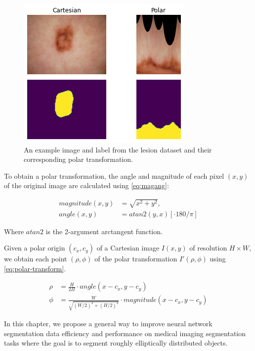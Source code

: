 	\begin{figure}[h]
		\centering
		\includegraphics[width=0.4\linewidth]{images/4/to_polar}
		\caption{An example image and label from the lesion dataset and their corresponding polar transformation.}
		\label{fig:polar-lesion}
	\end{figure}

To obtain a polar 
transformation, the angle and magnitude of each pixel $(x, y)$ of the original image are 
calculated using \eqref{eq:magang}:

  \begin{equation}
    \begin{aligned}
      magnitude(x, y) &= \sqrt{x^2 + y^2} , \\ 
      angle(x, y) &= atan2(y, x) [ \cdot 180 / \pi ]
    \end{aligned}
    \label{eq:magang}
  \end{equation}

Where $atan2$ is the 2-argument arctangent function.

Given a polar origin $(c_x, c_y)$ of a Cartesian image $I(x, y)$ of resolution $H \times W$, we obtain each point $(\rho, \phi)$ of the polar transformation $I'(\rho, \phi)$ using 
\eqref{eq:polar-transform}.

  \begin{equation}
    \begin{aligned}
      \rho &= \frac{H}{2 \Pi} \cdot angle(x - c_x, y - c_y) \\
      \phi &= \frac{W}{\sqrt{(W / 2)^2 + (H / 2)^2}} \cdot magnitude(x - c_x, y - c_y)
    \end{aligned}
    \label{eq:polar-transform}
  \end{equation}


In this chapter, we propose a general way to improve neural network segmentation data efficiency and performance 
on medical imaging segmentation tasks where the goal is to segment roughly 
elliptically distributed objects.

